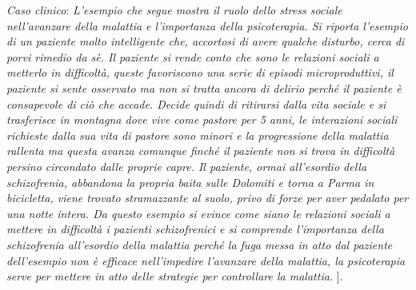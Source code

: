 \emph{Caso clinico}: \emph{L'esempio che segue mostra il ruolo dello
stress sociale nell'avanzare della malattia e l'importanza della
psicoterapia. Si riporta l'esempio di un paziente molto intelligente
che, accortosi di avere qualche disturbo, cerca di porvi rimedio da sè.
Il paziente si rende conto che sono le relazioni sociali a metterlo in
difficoltà, queste favoriscono una serie di episodi microproduttivi, il
paziente si sente osservato ma non si tratta ancora di delirio perché il
paziente è consapevole di ciò che accade. Decide quindi di ritirarsi
dalla vita sociale e si trasferisce in montagna dove vive come pastore
per 5 anni, le interazioni sociali richieste dalla sua vita di pastore
sono minori e la progressione della malattia rallenta ma questa avanza
comunque finché il paziente non si trova in difficoltà persino
circondato dalle proprie capre. Il paziente, ormai all'esordio della
schizofrenia, abbandona la propria baita sulle Dolomiti e torna a Parma
in bicicletta, viene trovato stramazzante al suolo, privo di forze per
aver pedalato per una notte intera. Da questo esempio si evince come
siano le relazioni sociali a mettere in difficoltà i pazienti
schizofrenici e si comprende l'importanza della schizofrenia all'esordio
della malattia perché la fuga messa in atto dal paziente dell'esempio
non è efficace nell'impedire l'avanzare della malattia, la psicoterapia
serve per mettere in atto delle strategie per controllare la malattia.}
{]}.
